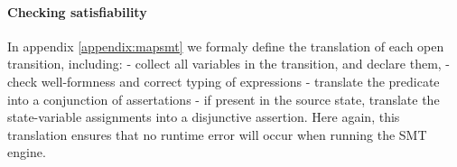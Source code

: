 \documentclass{lncs/llncs}
\newcommand{\TODO}[1]{\textcolor{red}{\textbf{[TODO:#1]}}}
\newcommand{\Post}{\symb{Post}}
\begin{document}



\paragraph{Checking satisfiability}

In appendix \ref{appendix:mapsmt} we formaly define the translation of each
open transition, including:
- collect all variables in the transition, and declare them,
- check well-formness and correct typing of expressions
- translate the predicate into a conjunction of assertations
- if present in the source state, translate the state-variable
assignments into a disjunctive assertion.
Here again, this translation ensures that no runtime error will occur
when running the SMT engine.
\end{document}
